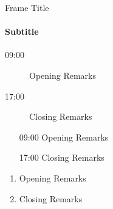 \documentclass[17pt]{beamer}
\begin{document}
\begin{frame}{Frame Title}

\framesubtitle{Subtitle}
    \begin{description}
        \item [09:00] Opening Remarks
        \item [17:00] Closing Remarks
    \end{description}

    \begin{itemize}
        \item [09:00] Opening Remarks
        \item [17:00] Closing Remarks
    \end{itemize}   

    \begin{enumerate}
        \item Opening Remarks
        \item Closing Remarks
    \end{enumerate}    
\end{frame}
\end{document}
